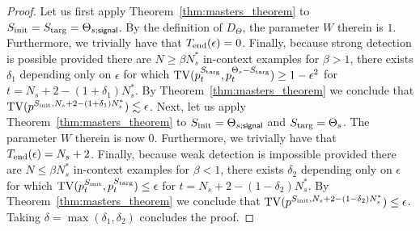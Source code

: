 \begin{proof} 
    Let us first apply Theorem~\ref{thm:masters_theorem} to $S_{\rm init} = S_{\rm targ} = \Theta_{s;\mathsf{signal}}$. By the definition of $D_\Theta$, the parameter $W$ therein is $1$. Furthermore, we trivially have that $T_{\rm end}(\epsilon) = 0$. Finally, because strong detection is possible provided there are $N \ge \beta N^*_s$ in-context examples for $\beta > 1$, there exists $\delta_1$ depending only on $\epsilon$ for which $\mathrm{TV}(p^{S_{\rm targ}}_t, p^{\Theta_s - S_{\rm targ}}_t) \ge 1 - \epsilon^2$ for $t = N_s + 2 - (1 + \delta_1)N^*_s$. By Theorem~\ref{thm:masters_theorem} we conclude that $\mathrm{TV}(p^{S_{\rm init}, N_s + 2 - (1 + \delta_1)N^*_s}) \lesssim \epsilon$. Next, let us apply Theorem~\ref{thm:masters_theorem} to $S_{\rm init} = \Theta_{s;\mathsf{signal}}$ and $S_{\rm targ} = \Theta_s$. The parameter $W$ therein is now $0$. Furthermore, we trivially have that $T_{\rm end}(\epsilon) = N_s + 2$. Finally, because weak detection is impossible provided there are $N \le \beta N^*_s$ in-context examples for $\beta < 1$, there exists $\delta_2$ depending only on $\epsilon$ for which $\mathrm{TV}(p^{S_{\rm init}}_t, p^{S_{\rm targ}}_t) \le \epsilon$ for $t = N_s + 2 - (1 - \delta_2)N^*_s$. By Theorem~\ref{thm:masters_theorem} we conclude that $\mathrm{TV}(p^{S_{\rm init}, N_s + 2 - (1 - \delta_2)N^*_s}) \le \epsilon$. Taking $\delta = \max(\delta_1, \delta_2)$ concludes the proof.
\end{proof}